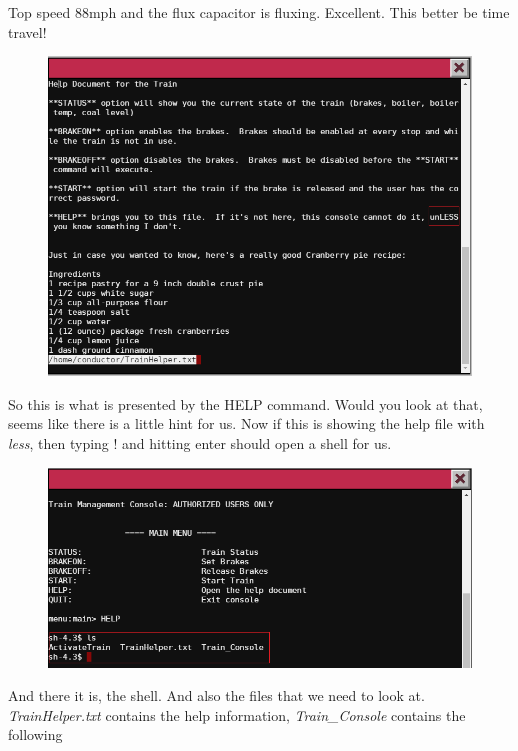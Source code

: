 \documentclass[writeup.tex]{subfiles}
\begin{document}
			Top speed 88mph and the flux capacitor is fluxing. Excellent. This better be time travel!
			
			\begin{figure}[H]
				\centering
				\includegraphics[width=\linewidth]{"screenshots/terminals/Terminal 5 - help screen"}
			\end{figure}
			
			So this is what is presented by the HELP command. Would you look at that, seems like there is a little hint for us. Now if this is showing the help file with \textit{less}, then typing ! and hitting enter should open a shell for us.
			
			\begin{figure}[H]
				\centering
				\includegraphics[width=\linewidth]{"screenshots/terminals/Terminal 5 - sh"}
			\end{figure}
			
			And there it is, the shell. And also the files that we need to look at. \textit{TrainHelper.txt} contains the help information, \textit{Train\_Console} contains the following
			
\end{document}
